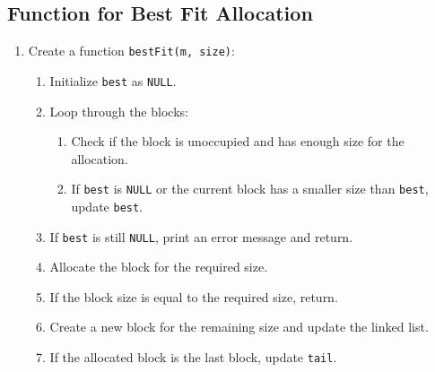 \subsection{Function for Best Fit Allocation}
\begin{enumerate}[label=\arabic*.,left=0pt]
  \item Create a function \texttt{bestFit(m, size)}:
        \begin{enumerate}[label=2.\arabic*.,left=0pt]
          \item Initialize \texttt{best} as \texttt{NULL}.
          \item Loop through the blocks:
                \begin{enumerate}[label=2.2.\arabic*.,left=0pt]
                  \item Check if the block is unoccupied and has enough size for the allocation.
                  \item If \texttt{best} is \texttt{NULL} or the current block has a smaller size than \texttt{best}, update \texttt{best}.
                \end{enumerate}
          \item If \texttt{best} is still \texttt{NULL}, print an error message and return.
          \item Allocate the block for the required size.
          \item If the block size is equal to the required size, return.
          \item Create a new block for the remaining size and update the linked list.
          \item If the allocated block is the last block, update \texttt{tail}.
        \end{enumerate}
\end{enumerate}

